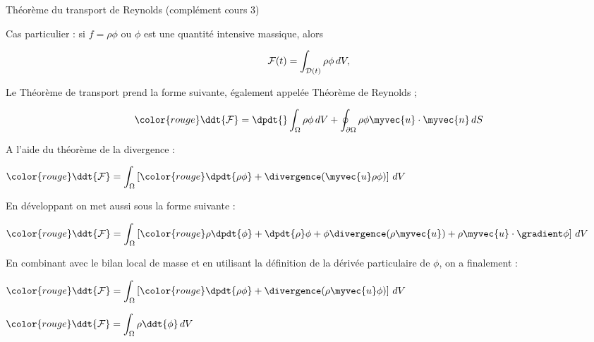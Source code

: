 {\begin{frame}{Théorème du transport de Reynolds (complément cours 3)}
\small



Cas particulier : si $f = \rho \phi$ ou $\phi$ est une quantité intensive massique, alors

\[
	\mathcal{F}(t) = \int_{{\cal D}(t)} \rho \phi \, dV,
\]





Le Théorème de transport prend la forme suivante, également appelée Théorème de Reynolds ;


\[
	\color{rouge}
	\ddt{\mathcal{F}} 
	= 
	\dpdt{} \int_\Omega \rho \phi \, dV + \oint_{\partial\Omega} \rho \phi \myvec{u}\cdot\myvec{n}\, dS
\]

A l'aide du théorème de la divergence :

$ \displaystyle \color{rouge}	
\ddt{\mathcal{F}} = 
\int_\Omega \left [{\color{rouge}\dpdt{\rho \phi}} + \divergence (\myvec{u} \rho \phi )\right ] \, dV
$


En développant on met aussi sous la forme suivante :

$ \displaystyle \color{rouge}	
\ddt{\mathcal{F}} = 
\int_\Omega \left [{\color{rouge}\rho \dpdt{ \phi}+ \dpdt{\rho} \phi } 
+ \phi \divergence (\rho \myvec{u}   ) +  \rho \myvec{u} \cdot \gradient \phi \right ] \, dV
$

En combinant avec le bilan local de masse et en utilisant la définition de la dérivée particulaire de $\phi$, on a finalement :

$ \displaystyle \color{rouge}	
\ddt{\mathcal{F}} = 
\int_\Omega \left [{\color{rouge}\dpdt{\rho \phi}} + \divergence ( \rho \myvec{u} \phi )\right ] \, dV
$



$ \displaystyle \color{rouge}	
\ddt{\mathcal{F}} = 
\int_\Omega \rho \ddt{\phi}  \, dV
$

\end{frame}




\bigskip



}
